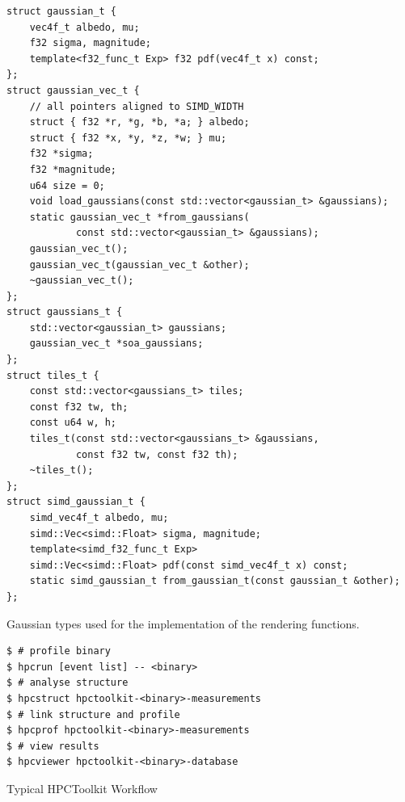 \documentclass[a4paper, 11pt]{memoir}
\begin{document}
    \begin{listing}[ht]
        \begin{verbatim}
struct gaussian_t {
    vec4f_t albedo, mu;
    f32 sigma, magnitude;
    template<f32_func_t Exp> f32 pdf(vec4f_t x) const;
};
struct gaussian_vec_t {
    // all pointers aligned to SIMD_WIDTH
    struct { f32 *r, *g, *b, *a; } albedo;
    struct { f32 *x, *y, *z, *w; } mu;
    f32 *sigma;
    f32 *magnitude;
    u64 size = 0;
    void load_gaussians(const std::vector<gaussian_t> &gaussians);
    static gaussian_vec_t *from_gaussians(
            const std::vector<gaussian_t> &gaussians);
    gaussian_vec_t();
    gaussian_vec_t(gaussian_vec_t &other);
    ~gaussian_vec_t();
};
struct gaussians_t {
    std::vector<gaussian_t> gaussians;
    gaussian_vec_t *soa_gaussians;
};
struct tiles_t {
    const std::vector<gaussians_t> tiles;
    const f32 tw, th;
    const u64 w, h;
    tiles_t(const std::vector<gaussians_t> &gaussians,
            const f32 tw, const f32 th);
    ~tiles_t();
};
struct simd_gaussian_t {
    simd_vec4f_t albedo, mu;
    simd::Vec<simd::Float> sigma, magnitude;
    template<simd_f32_func_t Exp>
    simd::Vec<simd::Float> pdf(const simd_vec4f_t x) const;
    static simd_gaussian_t from_gaussian_t(const gaussian_t &other);
};
        \end{verbatim}
        \caption{Gaussian types used for the implementation of the rendering functions.}
        \label{lst:gaussian_types_vrt_full}
    \end{listing}
    
    \begin{listing}[ht]
        \begin{verbatim}
$ # profile binary
$ hpcrun [event list] -- <binary>
$ # analyse structure
$ hpcstruct hpctoolkit-<binary>-measurements
$ # link structure and profile
$ hpcprof hpctoolkit-<binary>-measurements
$ # view results
$ hpcviewer hpctoolkit-<binary>-database
        \end{verbatim}
        \caption{Typical HPCToolkit Workflow}
        \label{lst:hpctoolkit_workflow}
    \end{listing}

    \backmatter
    \printglossaries
    \printbibliography[heading=bibintoc]
\end{document}
